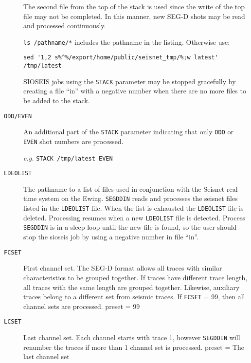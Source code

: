 \begin{description}
         The second file from the top of the stack is used since the
         write of the top file may not be completed.  In this manner,
         new SEG-D \glspl{shot} may be read and processed continuously.

         \texttt{ls /pathname/*} includes the pathname in the listing.  Otherwise use:
\lstset{language=csh}
\begin{lstlisting}
sed '1,2 s%^%/export/home/public/seisnet_tmp/%;w latest' /tmp/latest
\end{lstlisting}

         SIOSEIS jobs using the \texttt{STACK} parameter may be stopped
         gracefully by creating a file ``in'' with a negative number
         when there are no more files to be added to the stack.

\item[\texttt{ODD/EVEN}] An additional part of the \texttt{STACK} parameter indicating that
         only \texttt{ODD} or \texttt{EVEN} \gls{shot} numbers are processed.

         \textit{e.g.}    \texttt{STACK /tmp/latest  EVEN}

\item[\texttt{LDEOLIST}] The pathname to a list of files used in conjunction with
         the Seisnet real-time system on the Ewing.  \texttt{SEGDDIN} reads
         and processes the seisnet files listed in the \texttt{LDEOLIST} file.
         When the list is exhausted the \texttt{LDEOLIST} file is deleted.
         Processing resumes when a new \texttt{LDEOLIST} file is detected.
         Process \texttt{SEGDDIN} is in a sleep loop until the new file is
         found, so the user should stop the sioseis job by using a
         negative number in file ``in''.

\item[\texttt{FCSET}] First channel set.  The SEG-D format allows all traces with
         similar characteristics to be grouped together.  If traces
         have different trace length, all traces with the same length
         are grouped together.  Likewise, auxiliary traces belong
         to a different set from seismic traces.
      If \texttt{FCSET} = 99, then all channel sets are processed.
         \Gls{preset} = 99

\item[\texttt{LCSET}] Last channel set.  Each channel starts with trace 1, however
         \texttt{SEGDDIN} will renumber the traces if more than 1 channel set
         is processed.
         \Gls{preset} = The last channel set


\end{description}

